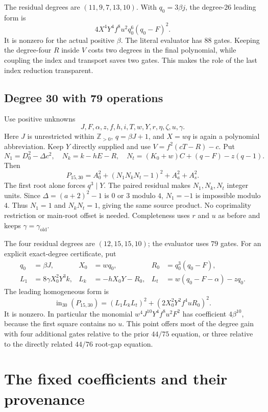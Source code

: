 \documentclass[11pt,a4paper]{article}
\theoremstyle{remark}
\newcommand{\Zp}{\mathbb Z_{>0}}
\newcommand{\Pone}{P_{15,30}}
\newcommand{\ord}{\mathrm{old}}
\begin{document}
The residual degrees are $(11,9,7,13,10)$. With $q_0=3\beta j$, the
degree-$26$ leading form is
\[
 4X^4Y^4f^8u^2q_0^6(q_0-F)^2.
\]
It is nonzero for the actual positive $\beta$. The literal evaluator has
$88$ gates. Keeping the degree-four $R$ inside $V$ costs two degrees in
the final polynomial, while coupling the index and transport saves two
gates. This makes the role of the last index reduction transparent.

\subsection{Degree 30 with 79 operations}

Use positive unknowns
\[
 J,F,\alpha,z,f,h,i,T,w,Y,r,\eta,\zeta,u,\gamma.
\]
Here $J$ is unrestricted within $\Zp$, $q=\beta J+1$, and $X=wq$ is
again a polynomial abbreviation. Keep $Y$ directly supplied and use
$V=f^2(cT-R)-c$. Put
\[
 N_1=D_0^2-\Delta c^2,\quad N_k=k-hE-R,\quad
 N_t=(K_0+w)C+(q-F)-z(q-1).
\]
Then
\begin{equation}
 \Pone=A_0^2+(N_1N_kN_t-1)^2+A_a^2+A_s^2.
 \label{eq:p30}
\end{equation}
The first root alone forces $q^3\mid Y$. The paired residual makes
$N_1,N_k,N_t$ integer units. Since $\Delta=(a+2)^2-1$ is $0$ or $3$
modulo $4$, $N_1=-1$ is impossible modulo $4$. Thus $N_1=1$ and
$N_kN_t=1$, giving the same source product. No coprimality restriction
or main-root offset is needed. Completeness uses $r$ and $u$ as before
and keeps $\gamma=\gamma_{\ord}$.

The four residual degrees are $(12,15,15,10)$; the evaluator uses $79$
gates. For an explicit exact-degree certificate, put
\begin{align*}
 q_0&=\beta J,&X_0&=wq_0,&R_0&=q_0^3(q_0-F),\\
 L_1&=8\gamma X_0^2Y^3k,&L_k&=-hX_0Y-R_0,&
 L_t&=w(q_0-F-\alpha)-zq_0.
\end{align*}
The leading homogeneous form is
\[
 \operatorname{in}_{30}(\Pone)
       =(L_1L_kL_t)^2+(2X_0^2Y^2f^4uR_0)^2.
\]
It is nonzero. In particular the monomial
$w^4J^{10}Y^4f^8u^2F^2$ has coefficient $4\beta^{10}$, because the
first square contains no $u$. This point offers most of the degree gain
with four additional gates relative to the prior $44/75$ equation, or
three relative to the directly related $44/76$ root-gap equation.



\section{The fixed coefficients and their provenance}
\label{sec:coefficients}
\end{document}
